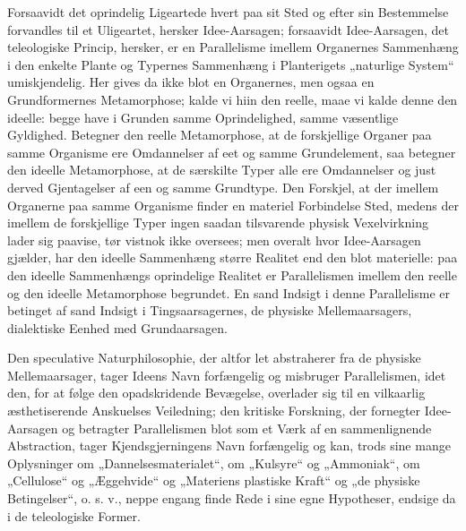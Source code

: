 \documentclass[12pt,a4paper]{book}
\begin{document}
Forsaavidt det oprindelig Ligeartede hvert paa sit Sted og efter sin
Bestemmelse forvandles til et Uligeartet, hersker Idee-Aarsagen;
forsaavidt Idee-Aarsagen, det teleologiske Princip, hersker, er en
Parallelisme imellem Organernes Sammenhæng i den enkelte Plante og
Typernes Sammenhæng i Planterigets „naturlige System“ umiskjendelig. Her
gives da ikke blot en Organernes, men ogsaa en Grundformernes
Metamorphose; kalde vi hiin den reelle, maae vi kalde denne den ideelle:
begge have i Grunden samme Oprindelighed, samme væsentlige Gyldighed.
Betegner den reelle Metamorphose, at de forskjellige Organer paa samme
Organisme ere Omdannelser af eet og samme Grundelement, saa betegner den
ideelle Metamorphose, at de særskilte Typer alle ere Omdannelser og just
derved Gjentagelser af een og samme Grundtype. Den Forskjel, at der
imellem Organerne paa samme Organisme finder en materiel Forbindelse
Sted, medens der imellem de forskjellige Typer ingen saadan tilsvarende
physisk Vexelvirkning lader sig paavise, tør vistnok ikke oversees; men
overalt hvor Idee-Aarsagen gjælder, har den ideelle Sammenhæng større
Realitet end den blot materielle: paa den ideelle Sammenhængs
oprindelige Realitet er Parallelismen imellem den reelle og den ideelle
Metamorphose begrundet. En sand Indsigt i denne Parallelisme er betinget
af sand Indsigt i Tingsaarsagernes, de physiske Mellemaarsagers,
dialektiske Eenhed med Grundaarsagen.

Den speculative Naturphilosophie, der altfor let abstraherer fra de
physiske Mellemaarsager, tager Ideens Navn forfængelig og misbruger
Parallelismen, idet den, for at følge den opadskridende Bevægelse,
overlader sig til en vilkaarlig æsthetiserende Anskuelses Veiledning;
den kritiske Forskning, der fornegter Idee-Aarsagen og betragter
Parallelismen blot som et Værk af en sammenlignende Abstraction, tager
Kjendsgjerningens Navn forfængelig og kan, trods sine mange Oplysninger
om „Dannelsesmaterialet“, om „Kulsyre“ og „Ammoniak“, om „Cellulose“ og
„Æggehvide“ og „Materiens plastiske Kraft“ og „de physiske
Betingelser“, o. s. v., neppe engang finde Rede i sine egne Hypotheser,
endsige da i de teleologiske Former.
\end{document}
